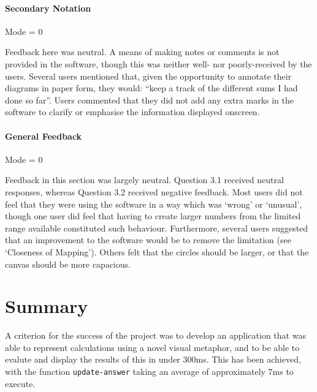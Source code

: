 \documentclass[12pt,twoside,notitlepage,xetex]{report}
\begin{document}
\paragraph{Secondary Notation}\hfill

Mode = 0

Feedback here was neutral.  A means of making notes or comments is not provided in the software, though this was neither well- nor poorly-received by the users.  Several users mentioned that, given the opportunity to annotate their diagrams in paper form, they would: ``keep a track of the different sums I had done so far''.  Users commented that they did not add any extra marks in the software to clarify or emphasise the information displayed onscreen.

\newpage
\paragraph{General Feedback}\hfill

Mode = 0

Feedback in this section was largely neutral.  Question 3.1 received neutral responses, whereas Question 3.2 received negative feedback.  Most users did not feel that they were using the software in a way which was `wrong' or `unusual', though one user did feel that having to create larger numbers from the limited range available constituted such behaviour.  Furthermore, several users suggested that an improvement to the software would be to remove the limitation (see `Closeness of Mapping').  Others felt that the circles should be larger, or that the canvas should be more capacious.

\section{Summary}
A criterion for the success of the project was to develop an application that was able to represent calculations using a novel visual metaphor, and to be able to evalute and display the results of this in under 300ms.  This has been achieved, with the function \verb¬update-answer¬ taking an average of approximately 7ms to execute.
\end{document}
